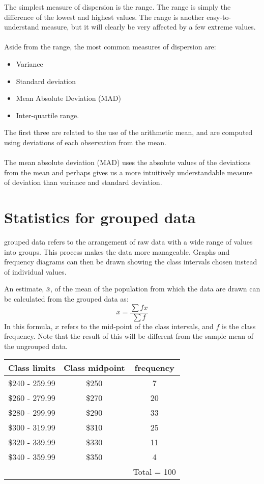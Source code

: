 \documentclass[12pt]{article}
\begin{document}
\noindent The simplest measure of dispersion is the range.
The range is simply the difference of the lowest and highest values. The range is
another easy-to-understand measure, but it will clearly be very affected by a few
extreme values.\\\\
\noindent Aside from the range, the most common measures of dispersion are:
\begin{itemize}
\item Variance
\item Standard deviation
\item Mean Absolute Deviation (MAD)
\item Inter-quartile range.
\end{itemize}
\noindent The first three are related to the use of the arithmetic mean, and are computed using deviations of each observation from the mean.\\\\\noindent The mean absolute deviation (MAD) uses the absolute values of the deviations from
the mean and perhaps gives us a more intuitively understandable measure of deviation than
variance and standard deviation.

\section{Statistics for grouped data}
grouped data refers to the arrangement of raw data with a wide range of values into groups. This process makes the data more manageable. Graphs and frequency diagrams can then be drawn showing the class intervals chosen instead of individual values.


\noindent An estimate, $\bar{x}$, of the mean of the population from which the data are drawn can be calculated from the grouped data as:
\[ \bar{x} = \frac{\sum f x }{\sum f}\]
In this formula, $x$ refers to the mid-point of the class intervals, and $f$ is the class frequency. Note that the result of this will be different from the sample mean of the ungrouped data.

\newpage

\begin{tabular}{|c|c|c|}
\hline
Class limits& Class midpoint & frequency \\
  \hline
\$240 - 259.99 & \$250 &7\\
\$260 - 279.99 & \$270 &20\\
\$280 - 299.99 & \$290 &33\\
\$300 - 319.99 & \$310 &25\\
\$320 - 339.99 & \$330 &11\\
\$340 - 359.99 & \$350 &4\\
\hline
& & Total = 100\\
  \hline
\end{tabular}
\end{document}
